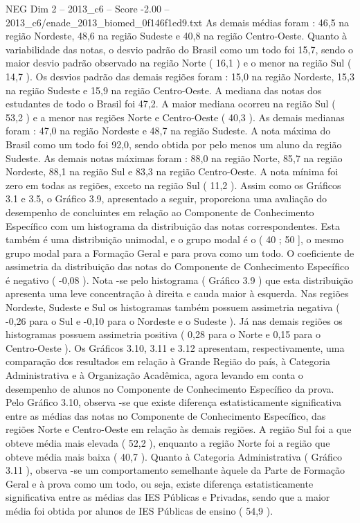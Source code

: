 \begin{textsample}{NEG Dim 2 – 2013\_c6 – Score -2.00 – 2013\_c6/enade\_2013\_biomed\_0f146f1ed9.txt}
As demais médias foram : 46,5 na região Nordeste, 48,6 na região Sudeste e 40,8 na região Centro-Oeste.
Quanto à variabilidade das notas, o desvio padrão do Brasil como um todo foi 15,7, sendo o maior desvio padrão observado na região Norte ( 16,1 ) e o menor na região Sul ( 14,7 ).
Os desvios padrão das demais regiões foram : 15,0 na região Nordeste, 15,3 na região Sudeste e 15,9 na região Centro-Oeste.
A mediana das notas dos estudantes de todo o Brasil foi 47,2.
A maior mediana ocorreu na região Sul ( 53,2 ) e a menor nas regiões Norte e Centro-Oeste ( 40,3 ).
As demais medianas foram : 47,0 na região Nordeste e 48,7 na região Sudeste.
A nota máxima do Brasil como um todo foi 92,0, sendo obtida por pelo menos um aluno da região Sudeste.
As demais notas máximas foram : 88,0 na região Norte, 85,7 na região Nordeste, 88,1 na região Sul e 83,3 na região Centro-Oeste.
A nota mínima foi zero em todas as regiões, exceto na região Sul ( 11,2 ).
Assim como os Gráficos 3.1 e 3.5, o Gráfico 3.9, apresentado a seguir, proporciona uma avaliação do desempenho de concluintes em relação ao Componente de Conhecimento Específico com um histograma da distribuição das notas correspondentes.
Esta também é uma distribuição unimodal, e o grupo modal é o ( 40 ; 50 ], o mesmo grupo modal para a Formação Geral e para prova como um todo.
O coeficiente de assimetria da distribuição das notas do Componente de Conhecimento Específico é negativo ( -0,08 ).
Nota -se pelo histograma ( Gráfico 3.9 ) que esta distribuição apresenta uma leve concentração à direita e cauda maior à esquerda.
Nas regiões Nordeste, Sudeste e Sul os histogramas também possuem assimetria negativa ( -0,26 para o Sul e -0,10 para o Nordeste e o Sudeste ).
Já nas demais regiões os histogramas possuem assimetria positiva ( 0,28 para o Norte e 0,15 para o Centro-Oeste ).
Os Gráficos 3.10, 3.11 e 3.12 apresentam, respectivamente, uma comparação dos resultados em relação à Grande Região do país, à Categoria Administrativa e à Organização Acadêmica, agora levando em conta o desempenho de alunos no Componente de Conhecimento Específico da prova.
Pelo Gráfico 3.10, observa -se que existe diferença estatisticamente significativa entre as médias das notas no Componente de Conhecimento Específico, das regiões Norte e Centro-Oeste em relação às demais regiões.
A região Sul foi a que obteve média mais elevada ( 52,2 ), enquanto a região Norte foi a região que obteve média mais baixa ( 40,7 ).
Quanto à Categoria Administrativa ( Gráfico 3.11 ), observa -se um comportamento semelhante àquele da Parte de Formação Geral e à prova como um todo, ou seja, existe diferença estatisticamente significativa entre as médias das IES Públicas e Privadas, sendo que a maior média foi obtida por alunos de IES Públicas de ensino ( 54,9 ).

\end{textsample}
